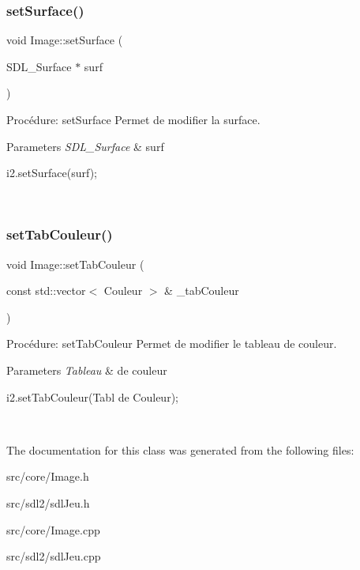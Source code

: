 \subsubsection{\texorpdfstring{set\+Surface()}{setSurface()}}
{\footnotesize\ttfamily void Image\+::set\+Surface (\begin{DoxyParamCaption}\item[{S\+D\+L\+\_\+\+Surface $\ast$}]{surf }\end{DoxyParamCaption})}



Procédure\+: set\+Surface Permet de modifier la surface. 


\begin{DoxyParams}{Parameters}
{\em S\+D\+L\+\_\+\+Surface} & surf 
\begin{DoxyCode}
i2.setSurface(surf);
\end{DoxyCode}
 \\
\hline
\end{DoxyParams}
\mbox{\label{classImage_a17feecebcbde65970ffa419ba9f0465a}} 
\subsubsection{\texorpdfstring{set\+Tab\+Couleur()}{setTabCouleur()}}
{\footnotesize\ttfamily void Image\+::set\+Tab\+Couleur (\begin{DoxyParamCaption}\item[{const std\+::vector$<$ Couleur $>$ \&}]{\+\_\+tab\+Couleur }\end{DoxyParamCaption})}



Procédure\+: set\+Tab\+Couleur Permet de modifier le tableau de couleur. 


\begin{DoxyParams}{Parameters}
{\em Tableau} & de couleur 
\begin{DoxyCode}
i2.setTabCouleur(Tabl de Couleur);
\end{DoxyCode}
 \\
\hline
\end{DoxyParams}


The documentation for this class was generated from the following files\+:\begin{DoxyCompactItemize}
\item 
src/core/Image.\+h\item 
src/sdl2/sdl\+Jeu.\+h\item 
src/core/Image.\+cpp\item 
src/sdl2/sdl\+Jeu.\+cpp\end{DoxyCompactItemize}
